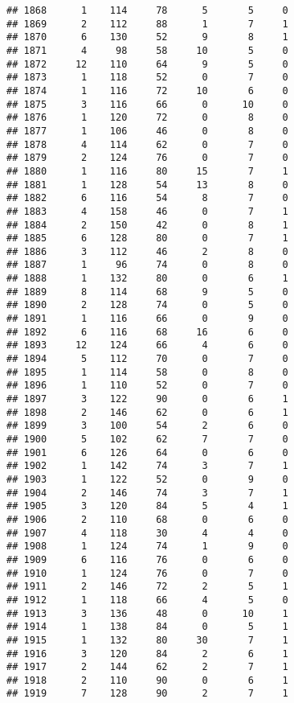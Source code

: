 \documentclass[
]{article}
\begin{document}
\begin{verbatim}
## 1868      1    114     78      5       5     0
## 1869      2    112     88      1       7     1
## 1870      6    130     52      9       8     1
## 1871      4     98     58     10       5     0
## 1872     12    110     64      9       5     0
## 1873      1    118     52      0       7     0
## 1874      1    116     72     10       6     0
## 1875      3    116     66      0      10     0
## 1876      1    120     72      0       8     0
## 1877      1    106     46      0       8     0
## 1878      4    114     62      0       7     0
## 1879      2    124     76      0       7     0
## 1880      1    116     80     15       7     1
## 1881      1    128     54     13       8     0
## 1882      6    116     54      8       7     0
## 1883      4    158     46      0       7     1
## 1884      2    150     42      0       8     1
## 1885      6    128     80      0       7     1
## 1886      3    112     46      2       8     0
## 1887      1     96     74      0       8     0
## 1888      1    132     80      0       6     1
## 1889      8    114     68      9       5     0
## 1890      2    128     74      0       5     0
## 1891      1    116     66      0       9     0
## 1892      6    116     68     16       6     0
## 1893     12    124     66      4       6     0
## 1894      5    112     70      0       7     0
## 1895      1    114     58      0       8     0
## 1896      1    110     52      0       7     0
## 1897      3    122     90      0       6     1
## 1898      2    146     62      0       6     1
## 1899      3    100     54      2       6     0
## 1900      5    102     62      7       7     0
## 1901      6    126     64      0       6     0
## 1902      1    142     74      3       7     1
## 1903      1    122     52      0       9     0
## 1904      2    146     74      3       7     1
## 1905      3    120     84      5       4     1
## 1906      2    110     68      0       6     0
## 1907      4    118     30      4       4     0
## 1908      1    124     74      1       9     0
## 1909      6    116     76      0       6     0
## 1910      1    124     76      0       7     0
## 1911      2    146     72      2       5     1
## 1912      1    118     66      4       5     0
## 1913      3    136     48      0      10     1
## 1914      1    138     84      0       5     1
## 1915      1    132     80     30       7     1
## 1916      3    120     84      2       6     1
## 1917      2    144     62      2       7     1
## 1918      2    110     90      0       6     1
## 1919      7    128     90      2       7     1

\end{verbatim}
\end{document}
